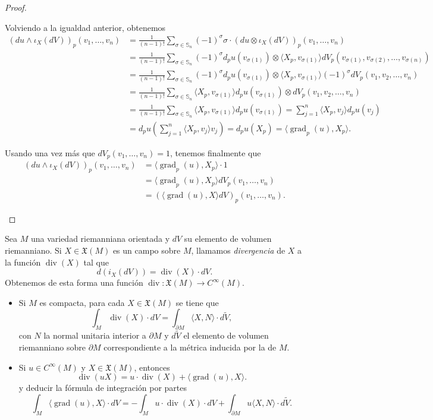 \documentclass[11pt]{article}
\newcommand{\Ss}{\mathbb{S}}
\newcommand{\X}{\mathfrak{X}}
\renewcommand{\div}{\operatorname{div}}
\newcommand{\grad}{\operatorname{grad}}
\newcommand{\ip}[1]{\langle #1 \rangle}
\newcommand{\paint}[1]{\color{color}{#1}}
\newenvironment{exercise}[2][Ejercicio]{\begin{trivlist}
\item[\hskip \labelsep \paint{{\bfseries #1}}\hskip \labelsep {\bfseries #2.}]}{\end{trivlist}}
\begin{document}
\begin{proof}
\begin{itemize}[listparindent = \parindent]
Volviendo a la igualdad anterior, obtenemos
\begin{align*}
(du \wedge \iota_X(dV))_p(v_1,\dots,v_n) &= \frac{1}{(n-1)!}\sum_{\sigma \in \Ss_{n}}(-1)^\sigma \sigma \cdot (du \otimes \iota_X(dV))_p(v_1, \dots, v_n)\\
&= \frac{1}{(n-1)!}\sum_{\sigma \in \Ss_{n}}(-1)^\sigma d_pu(v_{\sigma(1)}) \otimes \ip{X_p,v_{\sigma(1)}}dV_p(v_{\sigma(1)},v_{\sigma(2)}, \dots, v_{\sigma(n)})\\
&= \frac{1}{(n-1)!}\sum_{\sigma \in \Ss_{n}}(-1)^\sigma d_pu(v_{\sigma(1)}) \otimes \ip{X_p,v_{\sigma(1)}}(-1)^\sigma dV_p(v_1,v_2, \dots, v_n)\\
&= \frac{1}{(n-1)!}\sum_{\sigma \in \Ss_{n}}\ip{X_p,v_{\sigma(1)}}d_pu(v_{\sigma(1)}) \otimes dV_p(v_1,v_2, \dots, v_n)\\
&= \frac{1}{(n-1)!}\sum_{\sigma \in \Ss_{n}}\ip{X_p,v_{\sigma(1)}}d_pu(v_{\sigma(1)}) = \sum_{j=1}^n\ip{X_p,v_j}d_pu(v_j)\\
&= d_pu\left(\sum_{j=1}^n\ip{X_p,v_j}v_j\right) = d_pu(X_p) = \ip{\grad_p(u),X_p}.
\end{align*}
 
Usando una vez más que $dV_p(v_1, \dots, v_n) = 1$, tenemos finalmente que
\begin{align*}
(du \wedge \iota_X(dV))_p(v_1,\dots,v_n) &= \ip{\grad_p(u),X_p} \cdot 1\\
&= \ip{\grad_p(u),X_p}dV_p(v_1, \dots, v_n)\\
& = (\ip{\grad(u),X}dV)_p(v_1, \dots, v_n).
\end{align*}
\end{itemize}
\end{proof}
\newpage
\begin{exercise}{9}Sea $M$ una variedad riemanniana orientada y $dV$ su elemento de
volumen riemanniano. Si $X \in \X(M)$ es un campo sobre $M$,
llamamos \emph{divergencia} de $X$ a la función $\div(X)$ tal que
  \[
  d(i_X(dV)) = \div(X)\cdot dV.
  \]
Obtenemos de esta forma una función $\div:\X(M)\to C^\infty(M)$.
\begin{itemize}[listparindent = \parindent]
\item[a)] Si $M$ es compacta, para cada $X\in\X(M)$ se tiene que
  \[
  \int_M\div(X)\cdot dV = \int_{\partial M}\ip{X,N}\cdot d\tilde{V},
  \]
con $N$ la normal unitaria interior a $\partial M$ y $d\tilde V$ el
elemento de volumen riemanniano sobre $\partial M$ correspondiente a la
métrica inducida por la de $M$.

\item[b)] Si $u\in C^\infty(M)$ y $X\in\X(M)$, entonces
  \[
  \div(uX) = u\cdot\div(X) + \ip{\grad(u),X}.
  \]
y deducir la fórmula de integración por partes
  \[
  \int_M\ip{\grad(u),X}\cdot dV  
        = -\int_M u\cdot\div(X)\cdot dV
          +\int_{\partial M}u\ip{X,N}\cdot d\tilde V.
  \]
\end{itemize}  
\end{exercise}
\end{document}
